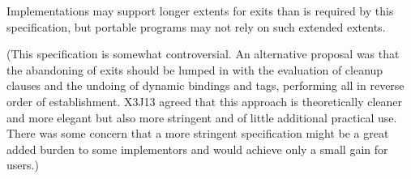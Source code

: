 \begin{defspec}
\begin{newer}
Implementations may support longer extents for exits than is
required by this specification,
but portable programs may not rely on such extended extents.

(This specification is somewhat controversial.  An alternative proposal was
that the abandoning of exits should be lumped in with
the evaluation of  cleanup clauses and the
undoing of dynamic bindings and  tags, performing all
in reverse order of establishment.  X3J13 agreed that this approach is
theoretically cleaner and more elegant but also more stringent
and of little additional practical use.  There was some concern that
a more stringent specification might be a great added burden to some
implementors and would achieve only a small gain for users.)
\end{newer}
\end{defspec}

